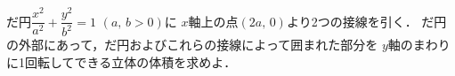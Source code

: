 \documentclass[../../main.tex]{subfiles}
\begin{document}
だ円$\displaystyle\dfrac{x^2}{a^2}+\dfrac{y^2}{b^2}=1$ $(a, \, b>0)$に
$x$軸上の点$(2a, \, 0)$より2つの接線を引く．
だ円の外部にあって，だ円およびこれらの接線によって囲まれた部分を
$y$軸のまわりに1回転してできる立体の体積を求めよ．
\end{document}
